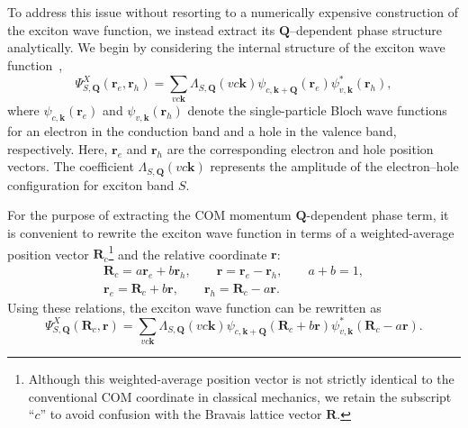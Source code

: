 %
%
%
%
%
%
\section{}

To address this issue without resorting to a numerically expensive construction of the exciton wave function, we instead extract its $\boldsymbol{Q}$--dependent phase structure analytically. We begin by considering the internal structure of the exciton wave function~\cite{bajaj2025symmetries, haber2023maximally},
\begin{equation}
\Psi^{X}_{S,\boldsymbol{Q}}
(\boldsymbol{r}_e,\boldsymbol{r}_h)
=
\sum_{vc\boldsymbol{k}}
\Lambda_{S,\boldsymbol{Q}}(vc\boldsymbol{k})
\psi_{c,\boldsymbol{k}+\boldsymbol{Q}}(\boldsymbol{r}_e)
\psi^{*}_{v,\boldsymbol{k}}(\boldsymbol{r}_h),
\label{excitonWF1}
\end{equation}
where $\psi_{c,\boldsymbol{k}}(\boldsymbol{r}_e)$ and $\psi_{v,\boldsymbol{k}}(\boldsymbol{r}_h)$ denote the single-particle Bloch wave functions for an electron in the conduction band and a hole in the valence band, respectively. Here, $\boldsymbol{r}_e$ and $\boldsymbol{r}_h$ are the corresponding electron and hole position vectors. The coefficient $\Lambda_{S,\boldsymbol{Q}}(vc\boldsymbol{k})$ represents the amplitude of the electron--hole configuration for exciton band $S$. 

For the purpose of extracting the COM momentum $\boldsymbol{Q}$-dependent phase term, it is convenient to rewrite the exciton wave function in terms of a weighted-average position vector $\boldsymbol{R}_c$\footnote{Although this weighted-average position vector is not strictly identical to the conventional COM coordinate in classical mechanics, we retain the subscript ``$c$'' to avoid confusion with the Bravais lattice vector $\boldsymbol{R}$.} and the relative coordinate $\boldsymbol{r}$:
\begin{equation}
\begin{gathered}
\boldsymbol{R}_c = a\boldsymbol{r}_e + b\boldsymbol{r}_h,
\qquad
\boldsymbol{r} = \boldsymbol{r}_e - \boldsymbol{r}_h,
\qquad
a + b = 1,
\\
\boldsymbol{r}_e = \boldsymbol{R}_c + b\boldsymbol{r},
\qquad
\boldsymbol{r}_h = \boldsymbol{R}_c - a\boldsymbol{r}.
\end{gathered}
\end{equation}
Using these relations, the exciton wave function can be rewritten as
\begin{equation}
\Psi^{X}_{S,\boldsymbol{Q}}(\boldsymbol{R}_c,\boldsymbol{r})
=
\sum_{vc\boldsymbol{k}}
\Lambda_{S,\boldsymbol{Q}}(vc\boldsymbol{k})
\psi_{c,\boldsymbol{k}+\boldsymbol{Q}}(\boldsymbol{R}_c + b\boldsymbol{r})
\psi^{*}_{v,\boldsymbol{k}}(\boldsymbol{R}_c - a\boldsymbol{r}).
\label{excitonWF2}
\end{equation}

